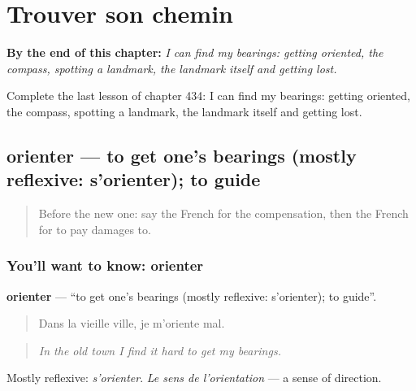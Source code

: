 
\chapter{Trouver son chemin}
\label{ch:fr-trouver-son-chemin}

\begin{chapteropening}
\textbf{By the end of this chapter:} \emph{I can find my bearings: getting oriented, the compass, spotting a landmark, the landmark itself and getting lost.}

Complete the last lesson of chapter 434: I can find my bearings: getting oriented, the compass, spotting a landmark, the landmark itself and getting lost.
\end{chapteropening}

\section[orienter]{orienter — to get one’s bearings (mostly reflexive: s’orienter); to guide}

\label{lesson:FR-C434-orienter}



\begin{quote}
Before the new one: say the French for the compensation, then the French for to pay damages to.
\end{quote}

\subsection*{You'll want to know: orienter}
\textbf{orienter} — \textquotedblleft{}to get one’s bearings (mostly reflexive: s’orienter); to guide\textquotedblright{}.

\begin{quote}
Dans la vieille ville, je m'oriente mal.
\end{quote}

\begin{quote}
\emph{In the old town I find it hard to get my bearings.}
\end{quote}

Mostly reflexive: \emph{s'orienter}. \emph{Le sens de l'orientation} — a sense of direction.

